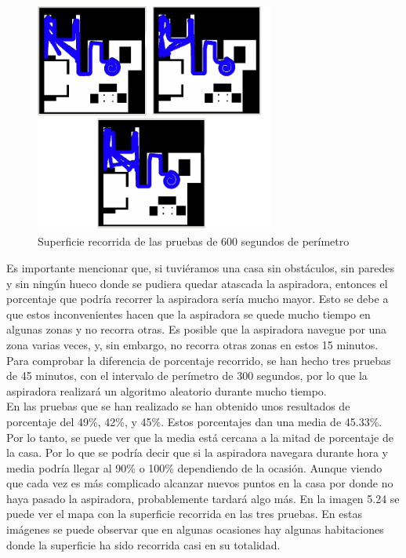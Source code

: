 \begin{figure}[H]
  \begin{center}
    \includegraphics[width=0.7\textwidth]{figures/Vacuum/Referee600.png}
		\caption{Superficie recorrida de las pruebas de 600 segundos de perímetro}
		\label{fig.Referee600}
		\end{center}
\end{figure}

Es importante mencionar que, si tuviéramos una casa sin obstáculos, sin paredes y sin ningún hueco donde se pudiera quedar atascada la aspiradora, entonces el porcentaje que podría recorrer la aspiradora sería mucho mayor. Esto se debe a que estos inconvenientes hacen que la aspiradora se quede mucho tiempo en algunas zonas y no recorra otras. Es posible que la aspiradora navegue por una zona varias veces, y, sin embargo, no recorra otras zonas en estos 15 minutos.\\

Para comprobar la diferencia de porcentaje recorrido, se han hecho tres pruebas de 45 minutos, con el intervalo de perímetro de 300 segundos, por lo que la aspiradora realizará un algoritmo aleatorio durante mucho tiempo. \\

En las pruebas que se han realizado se han obtenido unos resultados de porcentaje del 49\%, 42\%, y 45\%. Estos porcentajes dan una media de 45.33\%. Por lo tanto, se puede ver que la media está cercana a la mitad de porcentaje de la casa. Por lo que se podría decir que si la aspiradora navegara durante hora y media podría llegar al 90\% o 100\% dependiendo de la ocasión. Aunque viendo que cada vez es más complicado alcanzar nuevos puntos en la casa por donde no haya pasado la aspiradora, probablemente tardará algo más. En la imagen 5.24 se puede ver el mapa con la superficie recorrida en las tres pruebas. En estas imágenes se puede observar que en algunas ocasiones hay algunas habitaciones donde la superficie ha sido recorrida casi en su totalidad.\\

